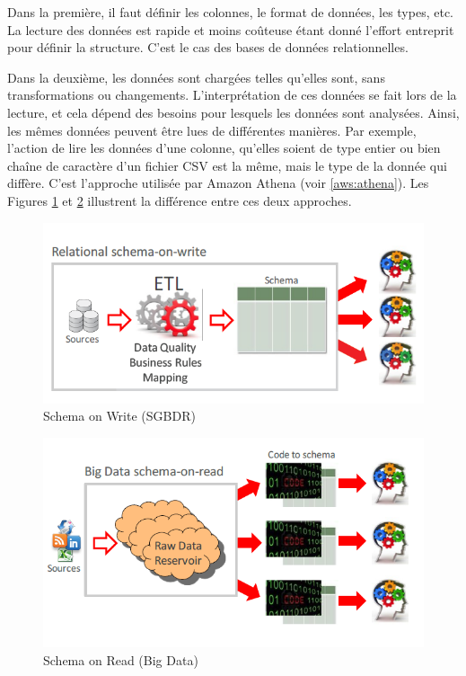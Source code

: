 		Dans la première, il faut définir les colonnes, le format de données, les types, etc. La lecture des données est rapide et moins coûteuse étant donné l'effort entreprit pour définir la structure. C'est le cas des bases de données relationnelles.
		
		Dans la deuxième, les données sont chargées telles qu'elles sont, sans transformations ou changements. L'interprétation de ces données se fait lors de la lecture, et cela dépend des besoins pour lesquels les données sont analysées. Ainsi, les mêmes données peuvent être lues de différentes manières. Par exemple, l'action  de lire les données  d'une colonne, qu'elles soient de type entier ou bien chaîne de caractère d'un fichier CSV est la même, mais le type de la donnée qui diffère. C'est l'approche utilisée par Amazon Athena (voir \ref{aws:athena}). Les Figures \ref{fig:on-write} et \ref{fig:on-read} illustrent la différence entre ces deux approches.
		\begin{figure}[H]
			\centering
			\includegraphics[width=0.8\linewidth]{illustrations/on-write}
			\caption{Schema on Write (SGBDR)}
			\label{fig:on-write}
		\end{figure}
		\begin{figure}[H]
			\centering
			\captionsetup{justification=centering}
			\includegraphics[width=0.8\linewidth]{illustrations/on-read}
			\caption{Schema on Read (Big Data)}
			\label{fig:on-read}
		\end{figure}
		
